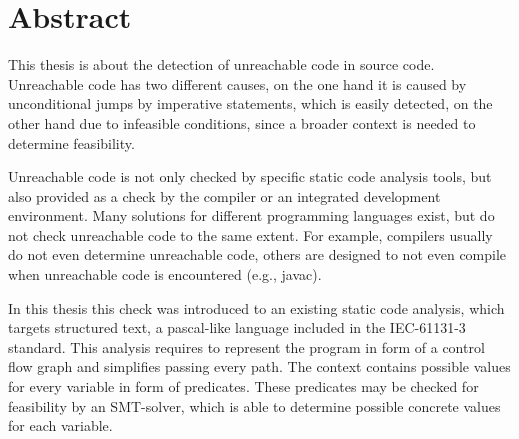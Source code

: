 \chapter{Abstract}
\label{cha:abstract}


This thesis is about the detection of unreachable code in source code. %
Unreachable code has two different causes, on the one hand it is caused by unconditional jumps by imperative statements, which is easily detected, on the other hand due to infeasible conditions, since a broader context is needed to determine feasibility.

Unreachable code is not only checked by specific static code analysis tools,  but also provided as a check by the compiler or an integrated development environment. Many solutions for different programming languages exist, but do not check unreachable code to the same extent. For example, compilers usually do not even determine unreachable code, others are designed to not even compile when unreachable code is encountered (e.g., javac).


In this thesis this check was introduced to an existing static code analysis, which targets structured text, a pascal-like language included in the IEC-61131-3 standard. This analysis requires to represent the program in form of a control flow graph and simplifies passing every path. The context contains possible values for every variable in form of predicates. These predicates may be checked for feasibility by an SMT-solver, which is able to determine possible concrete values for each variable. 